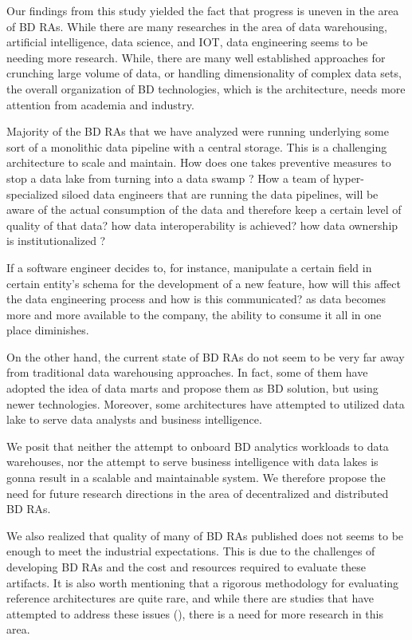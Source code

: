 \documentclass{ieeeaccess}
\begin{document}
Our findings from this study yielded the fact that progress is uneven in the area of BD RAs. While there are many researches in the area of data warehousing, artificial intelligence, data science, and IOT, data engineering seems to be needing more research. While, there are many well established approaches for crunching large volume of data, or handling dimensionality of complex data sets, the overall organization of BD technologies, which is the architecture, needs more attention from academia and industry. 

Majority of the BD RAs that we have analyzed were running underlying some sort of a monolithic data pipeline with a central storage. This is a challenging architecture to scale and maintain. How does one takes preventive measures to stop a data lake from turning into a data swamp ? How a team of hyper-specialized siloed data engineers that are running the data pipelines, will be aware of the actual consumption of the data and therefore keep a certain level of quality of that data? how data interoperability is achieved? how data ownership is institutionalized ?

If a software engineer decides to, for instance, manipulate a certain field in certain entity's schema for the development of a new feature, how will this affect the data engineering process and how is this communicated? as data becomes more and more available to the company, the ability to consume it all in one place diminishes. 

On the other hand, the current state of BD RAs do not seem to be very far away from traditional data warehousing approaches. In fact, some of them have adopted the idea of data marts and propose them as BD solution, but using newer technologies. Moreover, some architectures have attempted to utilized data lake to serve data analysts and business intelligence. 

We posit that neither the attempt to onboard BD analytics workloads to data warehouses, nor the attempt to serve business intelligence with data lakes is gonna result in a scalable and maintainable system. We therefore propose the need for future research directions in the area of decentralized and distributed BD RAs. 

We also realized that quality of many of BD RAs published does not seems to be enough to meet the industrial expectations. This is due to the challenges of developing BD RAs and the cost and resources required to evaluate these artifacts. It is also worth mentioning that a rigorous methodology for evaluating reference architectures are quite rare, and while there are studies that have attempted to address these issues (\cite{angelov2008towards}), there is a need for more research in this area.
\end{document}
